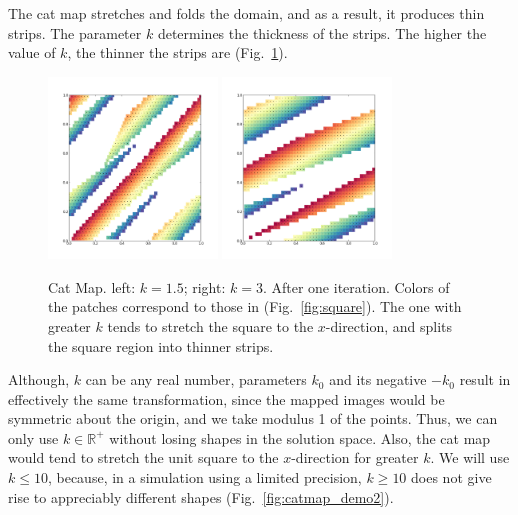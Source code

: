 \documentclass[12pt]{article}
\begin{document}
The cat map stretches and folds the domain, and as a result, it produces thin strips.
The parameter $k$ determines the thickness of the strips.
The higher the value of $k$, the thinner the strips are (Fig.~\ref{fig:catmap_demo1}).
\begin{figure}[t]
  \centering
  \includegraphics[width=0.4\textwidth]{catmap_1-5}
  \hspace{2cm}
  \includegraphics[width=0.4\textwidth]{catmap_3}
  \caption{Cat Map. left: $k=1.5$; right: $k = 3$. After one iteration. 
    Colors of the patches correspond to those in (Fig.~\ref{fig:square}).
    The one with greater $k$ tends to stretch the square to the $x$-direction, and splits the square region into thinner strips.
  }
  \label{fig:catmap_demo1}
\end{figure}

Although, $k$ can be any real number, parameters $k_0$ and its negative $-k_0$ result in effectively the same transformation, since the mapped images would be symmetric about the origin, and we take modulus 1 of the points.
Thus, we can only use $k \in \mathbb{R}^+$ without losing shapes in the solution space.
Also, the cat map would tend to stretch the unit square to the $x$-direction for greater $k$.
We will use $k \leq 10$, because, in a simulation using a limited precision, $k\geq 10$ does not give rise to appreciably different shapes (Fig.~\ref{fig:catmap_demo2}).
\end{document}
